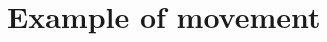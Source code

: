 \section{Example of movement}
\label{apx:movement}

\def \examplescale {6cm}
\newcommand{\example}[1]{
    \texttt{[image: fig/app/ex\#1.png]}
    \texttt{[image: fig/app/bad\#1.png]}
}

\restoregeometry
